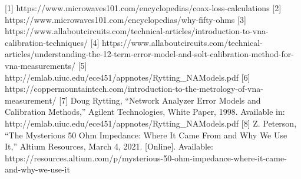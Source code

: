 \documentclass[
  letterpaper,
  DIV=11,
  numbers=noendperiod]{scrartcl}
\begin{document}
{[}1{]}
https://www.microwaves101.com/encyclopedias/coax-loss-calculations
{[}2{]} https://www.microwaves101.com/encyclopedias/why-fifty-ohms
{[}3{]}
https://www.allaboutcircuits.com/technical-articles/introduction-to-vna-calibration-techniques/
{[}4{]}
https://www.allaboutcircuits.com/technical-articles/understanding-the-12-term-error-model-and-solt-calibration-method-for-vna-measurements/
{[}5{]} http://emlab.uiuc.edu/ece451/appnotes/Rytting\_NAModels.pdf
{[}6{]}
https://coppermountaintech.com/introduction-to-the-metrology-of-vna-measurement/
{[}7{]} Doug Rytting, ``Network Analyzer Error Models and Calibration
Methods,'' Agilent Technologies, White Paper, 1998. Available in:
http://emlab.uiuc.edu/ece451/appnotes/Rytting\_NAModels.pdf {[}8{]} Z.
Peterson, ``The Mysterious 50 Ohm Impedance: Where It Came From and Why
We Use It,'' Altium Resources, March 4, 2021. {[}Online{]}. Available:
https://resources.altium.com/p/mysterious-50-ohm-impedance-where-it-came-and-why-we-use-it
\end{document}
